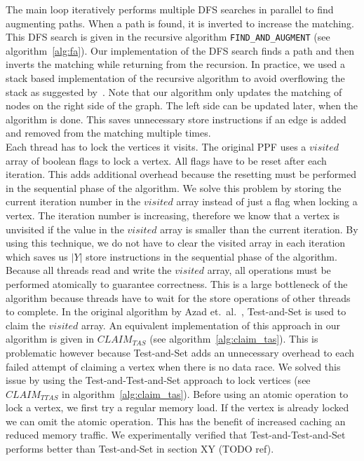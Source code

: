\documentclass[letterpaper]{article}
\begin{document}
The main loop iteratively performs multiple DFS searches in parallel to find augmenting paths. When a path is found, it is inverted to increase the matching.
This DFS search is given in the recursive algorithm \texttt{FIND\_AND\_AUGMENT} (see algorithm~\ref{alg:fa}). Our implementation of the DFS search finds a path and then inverts the matching while returning from the recursion. 
In practice, we used a stack based implementation of the recursive algorithm to avoid overflowing the stack as suggested by~\cite{Azad:2012}. 
Note that our algorithm only updates the matching of nodes on the right side of the graph. The left side can be updated later, when the algorithm is done. 
This saves unnecessary store instructions if an edge is added and removed from the matching multiple times.\\

Each thread has to lock the vertices it visits. The original PPF uses a $visited$ array of boolean flags to lock a vertex. 
All flags have to be reset after each iteration. This adds additional overhead because the resetting must be performed in the sequential phase of the algorithm.
We solve this problem by storing the current iteration number in the $visited$ array instead of just a flag when locking a vertex. The iteration number is increasing, 
therefore we know that a vertex is unvisited if the value in the $visited$ array is smaller than the current iteration. By using this technique, we do not have to clear
the visited array in each iteration which saves us $|Y|$ store instructions in the sequential phase of the algorithm.\\

Because all threads read and write the $visited$ array, all operations must be performed atomically to guarantee correctness. 
This is a large bottleneck of the algorithm because threads have to wait for the store operations of other threads to complete. 
In the original algorithm by Azad et.\ al.~\cite{Azad:2012}, Test-and-Set is used to claim the $visited$ array. 
An equivalent implementation of this approach in our algorithm is given in \texttt{$CLAIM_{TAS}$} (see algorithm~\ref{alg:claim_tas}). 
This is problematic however because Test-and-Set adds an unnecessary overhead to each failed attempt of claiming a vertex when there is no data race. 
We solved this issue by using the Test-and-Test-and-Set approach to lock vertices (see \texttt{$CLAIM_{TTAS}$} in algorithm~\ref{alg:claim_tas}).
Before using an atomic operation to lock a vertex, we first try a regular memory load. If the vertex is already locked we can omit the atomic operation. 
This has the benefit of increased caching an reduced memory traffic. We experimentally verified that Test-and-Test-and-Set performs better than Test-and-Set in section XY (TODO ref).
\end{document}
